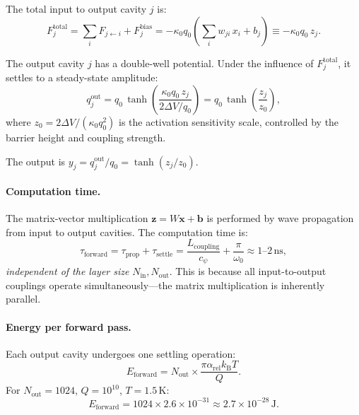 \documentclass[11pt,twocolumn]{article}
\theoremstyle{definition}
\theoremstyle{remark}
\newcommand{\kB}{k_{\mathrm{B}}}
\begin{document}
The total input to output cavity $j$ is:
\begin{equation}
F_j^{\mathrm{total}} = \sum_i F_{j\leftarrow i} + F_j^{\mathrm{bias}}
= -\kappa_0 q_0\left(\sum_i w_{ji}\,x_i + b_j\right)
\equiv -\kappa_0 q_0\,z_j.
\label{eq:total_input}
\end{equation}

The output cavity $j$ has a double-well potential. Under the influence
of $F_j^{\mathrm{total}}$, it settles to a steady-state amplitude:
\begin{equation}
q_j^{\mathrm{out}} = q_0\,\tanh\!\left(\frac{\kappa_0 q_0\,z_j}{2\Delta V/q_0}\right)
= q_0\,\tanh\!\left(\frac{z_j}{z_0}\right),
\label{eq:tanh_activation}
\end{equation}
where $z_0 = 2\Delta V/(\kappa_0 q_0^2)$ is the activation
sensitivity scale, controlled by the barrier height and coupling
strength.

The output is $y_j = q_j^{\mathrm{out}}/q_0 = \tanh(z_j/z_0)$.

\paragraph{Computation time.}
The matrix-vector multiplication $\mathbf{z} = W\mathbf{x} + \mathbf{b}$
is performed by wave propagation from input to output cavities. The
computation time is:
\begin{equation}
\tau_{\mathrm{forward}} = \tau_{\mathrm{prop}} + \tau_{\mathrm{settle}}
= \frac{L_{\mathrm{coupling}}}{c_\psi} + \frac{\pi}{\omega_0}
\approx 1\text{--}2\,\mathrm{ns},
\end{equation}
\emph{independent of the layer size} $N_{\mathrm{in}}, N_{\mathrm{out}}$.
This is because all input-to-output couplings operate simultaneously---the
matrix multiplication is inherently parallel.

\paragraph{Energy per forward pass.}
Each output cavity undergoes one settling operation:
\begin{equation}
E_{\mathrm{forward}} = N_{\mathrm{out}} \times \frac{\pi\alpha_{\mathrm{rel}}\kB T}{Q}.
\end{equation}
For $N_{\mathrm{out}} = 1024$, $Q = 10^{10}$, $T = 1.5\,\mathrm{K}$:
\begin{equation}
E_{\mathrm{forward}} = 1024 \times 2.6\times 10^{-31}
\approx 2.7\times 10^{-28}\,\mathrm{J}.
\end{equation}
\end{document}
